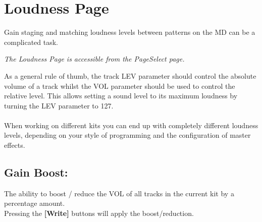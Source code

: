 \chapter{Loudness Page}
Gain staging and matching loudness levels between patterns on the MD can be a complicated task.

\textit{The Loudness Page is accessible from the PageSelect page.}

As a general rule of thumb, the track LEV parameter should control the absolute volume of a track whilst the VOL parameter should be used to control the relative level. This allows setting a sound level to its maximum loudness by turning the LEV parameter to 127.\\
\\
When working on different kits you can end up with completely different loudness levels, depending on your style of programming and the configuration of master effects.



\section{Gain Boost:}
The ability to boost / reduce the VOL of all tracks in the current kit by a percentage amount.
\\Pressing the \textbf{[Write]} buttons will apply the boost/reduction.
